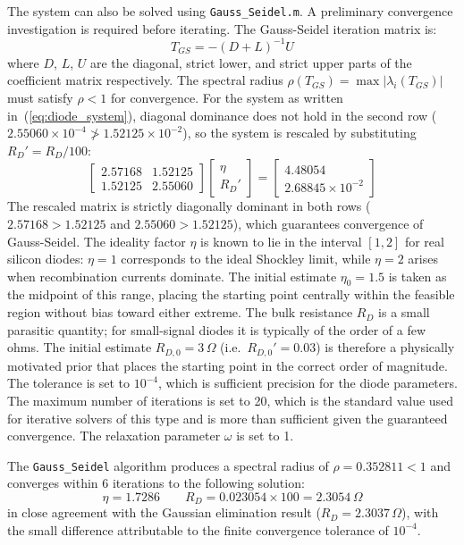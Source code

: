 \documentclass[12pt,a4paper]{article}
\begin{document}
The system can also be solved using \texttt{Gauss\_Seidel.m}. A preliminary convergence
investigation is required before iterating. The Gauss-Seidel iteration matrix is:
\[
    T_{GS} = -(D + L)^{-1}U
\]
where $D$, $L$, $U$ are the diagonal, strict lower, and strict upper parts of the coefficient
matrix respectively. The spectral radius $\rho(T_{GS}) = \max|\lambda_i(T_{GS})|$ must satisfy
$\rho < 1$ for convergence. For the system as written in~(\ref{eq:diode_system}), diagonal
dominance does not hold in the second row
($2.55060\times10^{-4} \not> 1.52125\times10^{-2}$), so the system is rescaled by
substituting $R_D' = R_D / 100$:
\begin{equation}
    \begin{bmatrix} 2.57168 & 1.52125 \\ 1.52125 & 2.55060
    \end{bmatrix}
    \begin{bmatrix} \eta \\ R_D' \end{bmatrix}
    =
    \begin{bmatrix} 4.48054 \\ 2.68845\times10^{-2} \end{bmatrix}
    \label{eq:diode_scaled}
\end{equation}
The rescaled matrix is strictly diagonally dominant in both rows
($2.57168 > 1.52125$ and $2.55060 > 1.52125$), which guarantees convergence of Gauss-Seidel.
The ideality factor $\eta$ is known to lie in the interval $[1, 2]$ for real silicon diodes:
$\eta = 1$ corresponds to the ideal Shockley limit, while $\eta = 2$ arises when recombination
currents dominate. The initial estimate $\eta_0 = 1.5$ is taken as the midpoint of this range,
placing the starting point centrally within the feasible region without bias toward either
extreme. The bulk resistance $R_D$ is a small parasitic quantity; for small-signal diodes it is
typically of the order of a few ohms. The initial estimate $R_{D,0} = 3\,\Omega$
(i.e.\ $R_{D,0}' = 0.03$) is therefore a physically motivated prior that places the starting
point in the correct order of magnitude. The tolerance is set to $10^{-4}$, which is sufficient
precision for the diode parameters. The maximum number of iterations is set to 20, which is
the standard value used for iterative solvers of this type and is more than sufficient given
the guaranteed convergence. The relaxation parameter $\omega$ is set to 1.

The \texttt{Gauss\_Seidel} algorithm produces a spectral radius of $\rho = 0.352811 < 1$
and converges within 6 iterations to the following solution:
\[
    \eta = 1.7286 \qquad R_D = 0.023054 \times 100 = 2.3054\,\Omega
\]
in close agreement with the Gaussian elimination result ($R_D = 2.3037\,\Omega$), with the
small difference attributable to the finite convergence tolerance of $10^{-4}$.
\end{document}
